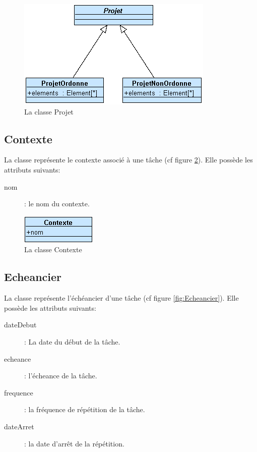 \begin{figure}[htbp]
	\centering
		\includegraphics[scale=1]{images/L3/structureDonnee/projets.png}
	\caption{La classe Projet}
	\label{fig:Projet}
\end{figure}

\subsection{Contexte}

	La classe  représente le contexte associé à une tâche (cf figure \ref{fig:Contexte}). Elle possède les attributs suivants:
	\begin{description}
		\item[nom]: le nom du contexte.
	\end{description}

\begin{figure}[htbp]
	\centering
		\includegraphics[scale=1]{images/L3/structureDonnee/contexte.png}
	\caption{La classe Contexte}
	\label{fig:Contexte}
\end{figure}

\subsection{Echeancier}

	La classe  représente l'échéancier d'une tâche (cf figure \ref{fig:Echeancier}). Elle possède les attributs suivants:
	\begin{description}
		\item[dateDebut]: La date du début de la tâche.
		\item[echeance]: l'écheance de la tâche.
		\item[frequence]: la fréquence de répétition de la tâche.
		\item[dateArret]: la date d'arrêt de la répétition.
	\end{description}

